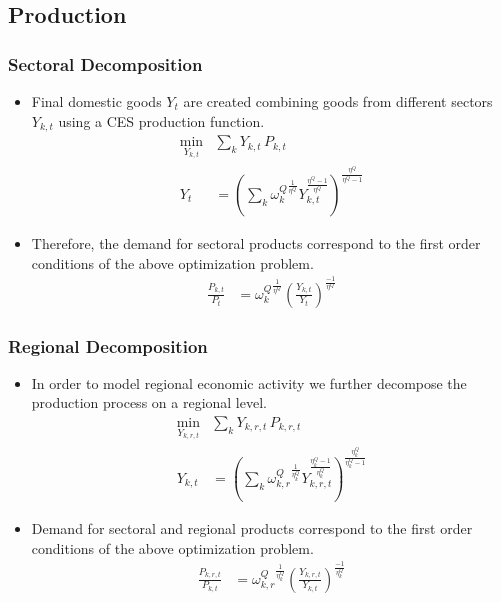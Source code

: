 \documentclass[11pt,aspectratio=169]{beamer}
\begin{document}
%
%
\subsection{Production}

\begin{frame}
\frametitle{Sectoral Decomposition}
\scriptsize
\begin{itemize}
\item Final domestic goods $Y_{t}$ are created combining goods from different sectors $Y_{k,t}$ using a CES production function.
\begin{align}
\underset{Y_{k,t}}{\mathrm{min}} & \sum_{k} Y_{k,t} \, P_{k,t} \\ 
Y_{t} &= \left(\sum_{k} {\omega^{Q}_{k}}^{\frac{1}{\eta^Q}} Y_{k,t}^{\frac{\eta^Q-1}{\eta^Q}} \right)^{\frac{\eta^Q}{\eta^Q-1}}
\end{align}

\item Therefore, the demand for sectoral products correspond to the first order conditions of the above optimization problem. 
\begin{align*}
\frac{P_{k,t}}{P_{t}} &= {\omega^{Q}_{k}}^{\frac{1}{\eta^Q}} \left(\frac{Y_{k,t}}{Y_{t}}\right)^{\frac{-1}{\eta^Q}}
\end{align*}
\end{itemize}
\end{frame}



\begin{frame}
\frametitle{Regional Decomposition}
\scriptsize
\begin{itemize}
\item In order to model regional economic activity we further decompose the production process on a regional level.
\begin{align*}
\underset{Y_{k,r,t}}{\mathrm{min}} & \sum_{k} Y_{k,r,t} \, P_{k,r,t} \\ 
Y_{k,t} &= \left(\sum_{k} {\omega^{Q}_{k,r}}^{\frac{1}{\eta^Q_{k}}} Y_{k,r,t}^{\frac{\eta^Q_{k}-1}{\eta^Q_{k}}} \right)^{\frac{\eta^Q_{k}}{\eta^Q_{k}-1}}
\end{align*}
\item Demand for sectoral and regional products correspond to the first order conditions of the above optimization problem.
\begin{align*}
\frac{P_{k,r,t}}{P_{k,t}} &= {\omega^{Q}_{k,r}}^{\frac{1}{\eta^{Q}_{k}}} \left(\frac{Y_{k,r,t}}{Y_{k,t}}\right)^{\frac{-1}{\eta^{Q}_{k}}}
\end{align*}
\end{itemize}
\end{frame}
\end{document}
